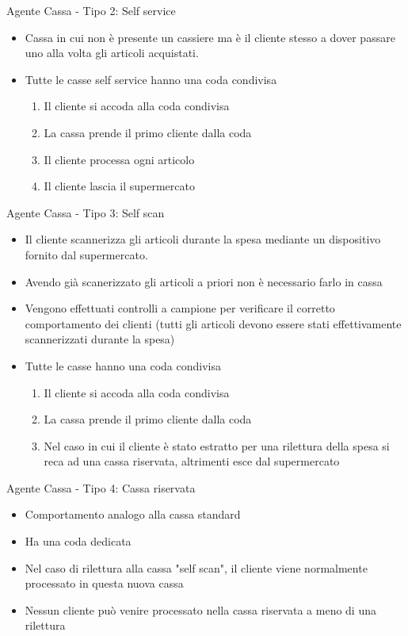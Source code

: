 \begin{frame}{Agente Cassa - Tipo 2: Self service}
	
	\begin{itemize}
		\item Cassa in cui non è presente un cassiere ma è il cliente stesso a dover passare uno alla volta gli articoli acquistati.
		\item Tutte le casse self service hanno una coda condivisa
		\begin{enumerate}
			\item Il cliente si accoda alla coda condivisa
			\item La cassa prende il primo cliente dalla coda
			\item Il cliente processa ogni articolo
			\item Il cliente lascia il supermercato
		\end{enumerate}		
	\end{itemize}
\end{frame}

\begin{frame}{Agente Cassa - Tipo 3: Self scan}
	
	\begin{itemize}
		\item Il cliente scannerizza gli articoli durante la spesa mediante un dispositivo fornito dal supermercato.
		\item Avendo già scanerizzato gli articoli a priori non è necessario farlo in cassa
		\item Vengono effettuati controlli a campione per verificare il corretto comportamento dei clienti (tutti gli articoli devono essere stati effettivamente scannerizzati durante la spesa)
		\item Tutte le casse hanno una coda condivisa
		\begin{enumerate}
			\item Il cliente si accoda alla coda condivisa
			\item La cassa prende il primo cliente dalla coda
			\item Nel caso in cui il cliente è stato estratto per una rilettura della spesa si reca ad una cassa riservata, altrimenti esce dal supermercato
		\end{enumerate}		
	\end{itemize}
\end{frame}

\begin{frame}{Agente Cassa - Tipo 4: Cassa riservata}
	
	\begin{itemize}
		\item Comportamento analogo alla cassa standard 
		\item Ha una coda dedicata
		\item Nel caso di rilettura alla cassa "self scan", il cliente viene normalmente processato in questa nuova cassa
		\item Nessun cliente può venire processato nella cassa riservata a meno di una rilettura
	\end{itemize}
\end{frame}


